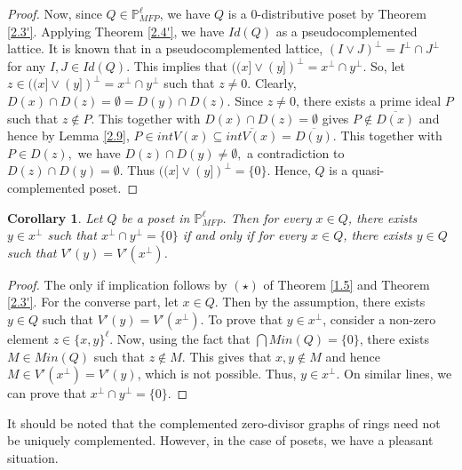 \documentclass[10pt,one side,emlines]{amsart}
\newtheorem{corollary}[lem]{Corollary}
\theoremstyle{definition}
\begin{document}
\begin{proof}
	
	Now, since $Q \in \mathbb{P}^{\ell}_{MFP}$, we have $Q$ is a $0$-distributive poset by Theorem \ref{2.3'}. Applying Theorem \ref{2.4'}, we have $Id(Q)$ as a pseudocomplemented lattice. It is known that in a pseudocomplemented lattice, $(I \vee J)^{\perp } = I^{\perp } \cap  J^{\perp }$ for any $I, J \in Id(Q)$. This implies that $((x] \vee (y])^{\perp}=x^{\perp} \cap y^{\perp}$. So, let $z \in  ((x] \vee (y])^{\perp}=x^{\perp} \cap y^{\perp}$ such that $z \neq 0$. Clearly, $D(x) \cap D(z)=\emptyset = D(y) \cap D(z)$. Since $z \neq 0$, there exists a prime ideal $P$ such that $z \notin P$. This together with  $D(x) \cap D(z)=\emptyset$ gives $P \notin \overline{D(x)}$ and hence by Lemma \ref{2.9},  $P \in int V(x) \subseteq \overline{int V(x)}=\overline{D(y)}.$ This together with $P\in D(z),$ we have $D(z) \cap D(y) \neq \emptyset,$  a contradiction to $D(z) \cap D(y) = \emptyset$. Thus $((x] \vee (y])^{\perp} = \{0\}$. Hence, $Q$ is a quasi-complemented poset.
\end{proof}

\begin{corollary}\label{1.8}
	Let $Q$ be a poset in $\mathbb{P}^{\ell}_{MFP}$. Then for every $x \in Q$, there exists $y \in x^{\perp}$ such that $x^{\perp} \cap y^{\perp}=\{0\}$ if and only if for every $x \in Q$, there exists $y \in Q$ such that $V'(y)=V'(x^{\perp})$.
\end{corollary}

\begin{proof} The only if implication follows by $(\star)$ of Theorem \ref{1.5} and Theorem \ref{2.3'}. For the converse part, let $x\in Q$. Then by the assumption, there exists $y\in Q$ such that $V'(y)= V'(x^{\perp})$. To prove that $y\in x^{\perp}$, consider a non-zero element $z\in \{x, y\}^{\ell}$. Now, using the fact that $\bigcap Min(Q)=\{0\}$, there exists $M\in Min(Q)$ such that $z\notin M$. This gives that $x,y\notin M$ and hence $M\in V'(x^{\perp})=V'(y)$, which is not possible. Thus, $y\in x^{\perp}$. On similar lines, we can prove that $x^{\perp}\cap y^{\perp}=\{0\}$.
\end{proof}

It should be noted that the complemented zero-divisor graphs of rings need not be uniquely complemented. However, in the case of posets, we have a pleasant situation. 
\end{document}
